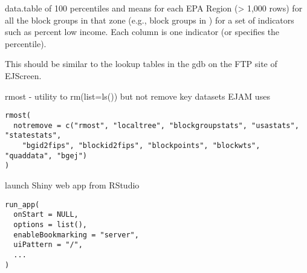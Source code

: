 \documentclass[a4paper]{book}
\begin{document}
%
\begin{Description}\relax
data.table of 100 percentiles and means for each EPA Region (> 1,000 rows)
for all the block groups in that zone (e.g., block groups in )
for a set of indicators such as percent low income.
Each column is one indicator (or specifies the percentile).

This should be similar to the lookup tables in the gdb on the FTP site of EJScreen.
\end{Description}
%
\begin{Description}\relax
rmost - utility to rm(list=ls()) but not remove key datasets EJAM uses
\end{Description}
%
\begin{Usage}
\begin{verbatim}
rmost(
  notremove = c("rmost", "localtree", "blockgroupstats", "usastats", "statestats",
    "bgid2fips", "blockid2fips", "blockpoints", "blockwts", "quaddata", "bgej")
)
\end{verbatim}
\end{Usage}
%
\begin{Description}\relax
launch Shiny web app from RStudio
\end{Description}
%
\begin{Usage}
\begin{verbatim}
run_app(
  onStart = NULL,
  options = list(),
  enableBookmarking = "server",
  uiPattern = "/",
  ...
)
\end{verbatim}
\end{Usage}
%
\end{document}
